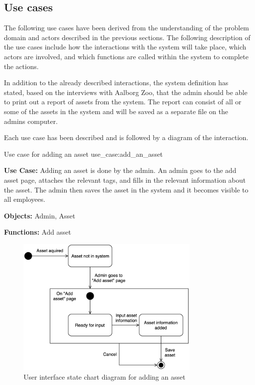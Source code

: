 \subsection{Use cases}\label{ssc:usecases}
The following use cases have been derived from the understanding of the problem domain and actors described in the previous sections. The following description of the use cases include how the interactions with the system will take place, which actors are involved, and which functions are called within the system to complete the actions.
\par
In addition to the already described interactions, the system definition has stated, based on the interviews with Aalborg Zoo, that the admin should be able to print out a report of assets from the system. The report can consist of all or some of the assets in the system and will be saved as a separate file on the admins computer.
\par
Each use case has been described and is followed by a diagram of the interaction.
\newline

    {Use case for adding an asset}
    {use_case:add_an_asset}
    {
        \textbf{Use Case:} Adding an asset is done by the admin. An admin goes to the add asset page, attaches the relevant tags, and fills in the relevant information about the asset. The admin then saves the asset in the system and it becomes visible to all employees.
    
        \vskip 0.2cm
        
        \textbf{Objects:} Admin, Asset
        
        \vskip 0.2cm
        
        \textbf{Functions:} Add asset
    }

\begin{figure}[H]
    \centering
    \includegraphics[width=0.8\textwidth]{figures/UseCases/UC_Add_asset.png}
    \caption{User interface state chart diagram for adding an asset}
    \label{fig:add_asset_statechart}
\end{figure}

